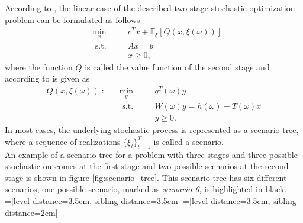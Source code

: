According to \cite{Lectures_on_stochastic_Programming_Shapiro_Ruszczynski}, the linear case of the described two-stage stochastic optimization problem can be formulated as follows
\begin{subequations}\label{stochastischeFormulierung}
    \begin{alignat}{3}
          &\min_x        &\quad& c^T x + \mathbb{E}_\xi \left[ Q(x,\xi(\omega))  \right] \label{SP_Zielfunktion mit EW}\\
          &\textrm{ s.t.}  &\quad& A x = b \\
          &              &\quad&x\geq0,
    \end{alignat}
\end{subequations}
where the function $Q$ is called the value function of the second stage and according to \cite{Lectures_on_stochastic_Programming_Shapiro_Ruszczynski} is given as
\begin{subequations}\label{Zweite_Stufe_Problem}
    \begin{alignat}{4}
         Q(x,\xi(\omega)) := & \min_y        &\quad& q^T(\omega)y  \\
                             & \textrm{ s.t.}  &\quad&W(\omega)y = h(\omega) - T(\omega)x \label{Recourse Gleichung}\\
                             &                &\quad&y\geq0.
    \end{alignat}
\end{subequations}
In most cases, the underlying stochastic process is represented as a scenario tree, where a sequence of realizations $\{\xi_t\}_{t=1}^{T}$ is called a scenario. \\
An example of a scenario tree for a problem with three stages and three possible stochastic outcomes at the first stage and two possible scenarios at the second stage is shown in figure \ref{fig:scenario_tree}.
This scenario tree has six different scenarios, one possible scenario, marked as \textit{scenario 6}, is highlighted in black.  \\
=[level distance=3.5cm, sibling distance=3.5cm]
=[level distance=3.5cm, sibling distance=2cm]

